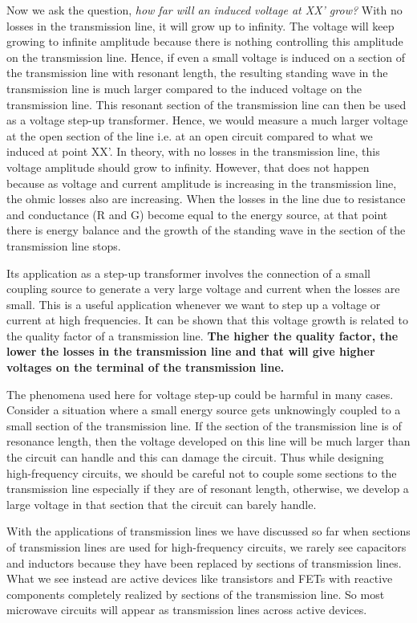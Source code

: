Now we ask the question, \emph{how far will an induced voltage at XX' grow?} With no losses in the transmission line, it will grow up to infinity. The voltage will keep growing to infinite amplitude because there is nothing controlling this amplitude on the transmission line. Hence, if even a small voltage is induced on a section of the transmission line with resonant length, the resulting standing wave in the transmission line is much larger compared to the induced voltage on the transmission line. This resonant section of the transmission line can then be used as a voltage step-up transformer. Hence, we would measure a much larger voltage at the open section of the line i.e. at an open circuit compared to what we induced at point XX'. In theory, with no losses in the transmission line, this voltage amplitude should grow to infinity. However, that does not happen because as voltage and current amplitude is increasing in the transmission line, the ohmic losses also are increasing. When the losses in the line due to resistance and conductance (R and G) become equal to the energy source, at that point there is energy balance and the growth of the standing wave in the section of the transmission line stops.

Its application as a step-up transformer involves the connection of a small coupling source to generate a very large voltage and current when the losses are small. This is a useful application whenever we want to step up a voltage or current at high frequencies. It can be shown that this voltage growth is related to the quality factor of a transmission line. \textbf{The higher the quality factor, the lower the losses in the transmission line and that will give higher voltages on the terminal of the transmission line.}

The phenomena used here for voltage step-up could be harmful in many cases. Consider a situation where a small energy source gets unknowingly coupled to a small section of the transmission line. If the section of the transmission line is of resonance length, then the voltage developed on this line will be much larger than the circuit can handle and this can damage the circuit. Thus while designing high-frequency circuits, we should be careful not to couple some sections to the transmission line especially if they are of resonant length, otherwise, we develop a large voltage in that section that the circuit can barely handle. 

With the applications of transmission lines we have discussed so far when sections of transmission lines are used for high-frequency circuits, we rarely see capacitors and inductors because they have been replaced by sections of transmission lines. What we see instead are active devices like transistors and FETs with reactive components completely realized by sections of the transmission line. So most microwave circuits will appear as transmission lines across active devices.

